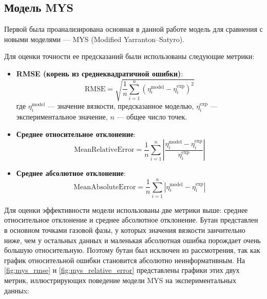 \documentclass[a4paper,12pt]{article}
\begin{document}
  \subsection{Модель MYS}

    Первой была проанализирована основная в данной работе модель для сравнения с новыми моделями — MYS (Modified Yarranton–Satyro).
    
    Для оценки точности ее предсказаний были использованы следующие метрики:
    
    \begin{itemize}
      \item \textbf{RMSE (корень из среднеквадратичной ошибки)}:
      \begin{equation}
        \mathrm{RMSE} = \sqrt{\frac{1}{n} \sum_{i=1}^{n} \left( \eta_i^{\text{model}} - \eta_i^{\text{exp}} \right)^2}
      \end{equation}
      где \( \eta_i^{\text{model}} \) — значение вязкости, предсказанное моделью, \( \eta_i^{\text{exp}} \) — экспериментальное значение, \( n \) — общее число точек.
    
      \item \textbf{Среднее относительное отклонение}:
      \begin{equation}
        \mathrm{MeanRelativeError} = \frac{1}{n} \sum_{i=1}^{n} \left| \frac{\eta_i^{\text{model}} - \eta_i^{\text{exp}}}{\eta_i^{\text{exp}}} \right|
      \end{equation}

      \item \textbf{Среднее абсолютное отклонение}:
      \begin{equation}
        \mathrm{MeanAbsoluteError} = \frac{1}{n} \sum_{i=1}^{n} \left| \eta_i^{\text{model}} - \eta_i^{\text{exp}} \right|
      \end{equation}
    \end{itemize}
    
    \medskip
    
   Для оценки эффективности модели использованы две метрики выше: среднее относительное отклонение и среднее абсолютное отклонение. Бутан представлен в основном точками газовой фазы, у которых значения вязкости занчительно ниже, чем у остальных данных и маленькая абсолютная ошибка порождает очень большую относительную. Поэтому бутан был исключен из рассмотрения, так как график относительной ошибки становится абсолютно неинформативным. На \autoref{fig:mys_rmse} и \autoref{fig:mys_relative_error} представлены графики этих двух метрик, иллюстрирующих поведение модели MYS на экспериментальных данныx:  
\end{document}
